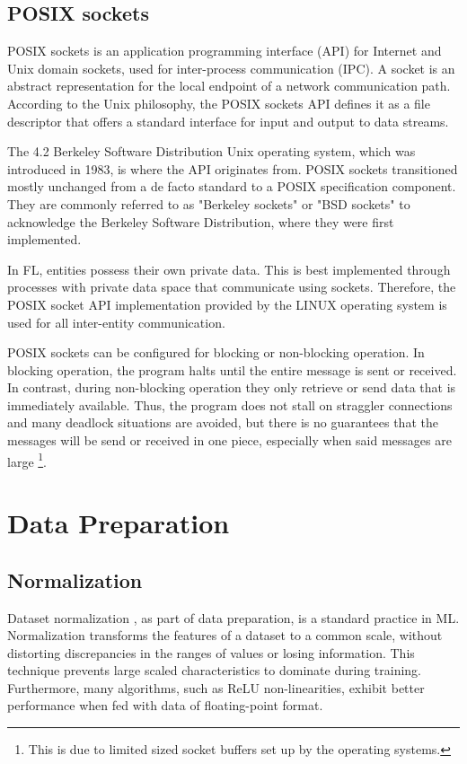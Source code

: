 \subsection{POSIX sockets}
POSIX sockets \cite{POSIX_socket} is an application programming interface (API) for Internet and Unix domain sockets, used for inter-process communication (IPC). A socket is an abstract representation for the local endpoint of a network communication path. According to the Unix philosophy, the POSIX sockets API defines it as a file descriptor that offers a standard interface for input and output to data streams.

The 4.2 Berkeley Software Distribution \cite{bsd} Unix operating system, which was introduced in 1983, is where the API originates from. POSIX sockets transitioned mostly unchanged from a de facto standard to a POSIX specification component. They are commonly referred to as "Berkeley sockets" or "BSD sockets" to acknowledge the Berkeley Software Distribution, where they were first implemented.
 
In FL, entities possess their own private data. This is best implemented through processes with private data space that communicate using sockets. Therefore, the POSIX socket API implementation provided by the LINUX operating system is used for all inter-entity communication. 

POSIX sockets can be configured for blocking or non-blocking operation. In blocking operation, the program halts until the entire message is sent or received. In contrast, during non-blocking operation they only retrieve or send data that is immediately available. Thus, the program does not stall on straggler connections and many deadlock situations are avoided, but there is no guarantees that the messages will be send or received in one piece, especially when said messages are large \footnote{This is due to limited sized socket buffers set up by the operating systems.}.

\section{Data Preparation}
\subsection{Normalization}
Dataset normalization \cite{dataset_norm}, as part of data preparation, is a standard practice in ML. Normalization transforms the features of a dataset to a common scale, without distorting discrepancies in the ranges of values or losing information. This technique prevents large scaled characteristics to dominate during training. Furthermore, many algorithms, such as ReLU non-linearities, exhibit better performance when fed with data of floating-point format.

